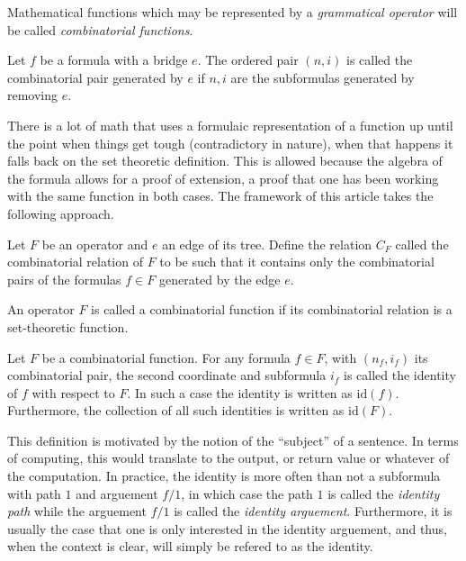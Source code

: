 \documentclass[twoside]{article}
\newenvironment{definition}[1][Definition]{\begin{trivlist}
\item[\hskip \labelsep {\bfseries #1}]}{\end{trivlist}}
\begin{document}
Mathematical functions which may be represented by a \emph{grammatical operator} will be called \emph{combinatorial
functions}.

\begin{definition}[Combinatorial Pair]

Let $ f $ be a formula with a bridge $ e $.  The ordered pair $ (n, i) $ is called the combinatorial pair
generated by $ e $ if $ n, i $ are the subformulas generated by removing $ e $.

\end{definition}

There is a lot of math that uses a formulaic representation of a function up until the point when things get tough
(contradictory in nature), when that happens it falls back on the set theoretic definition.  This is allowed because
the algebra of the formula allows for a proof of extension, a proof that one has been working with the same function
in both cases.  The framework of this article takes the following approach.

\begin{definition}[Combinatorial Relation]

Let $ F $ be an operator and $ e $ an edge of its tree.  Define the relation $ C_F $ called the combinatorial relation of
$ F $ to be such that it contains only the combinatorial pairs of the formulas $ f\in F $ generated by the edge $ e $.

\end{definition}

\begin{definition}[Combinatorial Function]

An operator $ F $ is called a combinatorial function if its combinatorial relation is a set-theoretic function.

\end{definition}

\begin{definition}[Identity]

Let $ F $ be a combinatorial function.  For any formula $ f\in F $, with $ (n_f, i_f) $ its combinatorial pair, the
second coordinate and subformula $ i_f $ is called the identity of $ f $ with respect to $ F $.  In such a case
the identity is written as $ \mbox{id}(f) $.  Furthermore, the collection of all such identities is written as
$ \mbox{id}(F) $.

\end{definition}
This definition is motivated by the notion of the ``subject'' of a sentence.  In terms of computing, this would
translate to the output, or return value or whatever of the computation.  In practice, the identity is more often
than not a subformula with path $ 1 $ and arguement $ f/1 $, in which case the path $ 1 $ is called the \emph{identity
path} while the arguement $ f/1 $ is called the \emph{identity arguement}.  Furthermore, it is usually the case that
one is only interested in the identity arguement, and thus, when the context is clear, will simply be refered to as
the identity.
\end{document}
